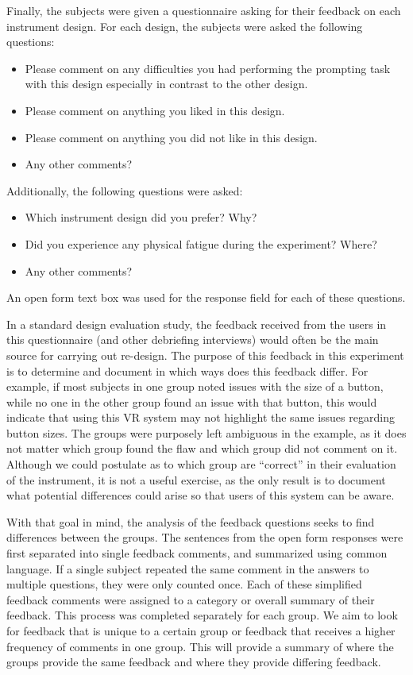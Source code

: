Finally, the subjects were given a questionnaire asking for their feedback on each instrument design.
For each design, the subjects were asked the following questions:
\begin{itemize}
    \item Please comment on any difficulties you had performing the prompting task with this design especially in contrast to the other design.
    \item Please comment on anything you liked in this design.
    \item Please comment on anything you did not like in this design.
    \item Any other comments?
\end{itemize}
Additionally, the following questions were asked:
\begin{itemize}
    \item Which instrument design did you prefer? Why?
    \item Did you experience any physical fatigue during the experiment? Where?
    \item Any other comments?
\end{itemize}
An open form text box was used for the response field for each of these questions.

In a standard design evaluation study, the feedback received from the users in this questionnaire (and other debriefing interviews) would often be the main source for carrying out re-design.
The purpose of this feedback in this experiment is to determine and document in which ways does this feedback differ.
For example, if most subjects in one group noted issues with the size of a button, while no one in the other group found an issue with that button, this would indicate that using this VR system may not highlight the same issues regarding button sizes.
The groups were purposely left ambiguous in the example, as it does not matter which group found the flaw and which group did not comment on it.
Although we could postulate as to which group are ``correct'' in their evaluation of the instrument, it is not a useful exercise, as the only result is to document what potential differences could arise so that users of this system can be aware.

With that goal in mind, the analysis of the feedback questions seeks to find differences between the groups.
The sentences from the open form responses were first separated into single feedback comments, and summarized using common language.
If a single subject repeated the same comment in the answers to multiple questions, they were only counted once.
Each of these simplified feedback comments were assigned to a category or overall summary of their feedback.
This process was completed separately for each group.
We aim to look for feedback that is unique to a certain group or feedback that receives a higher frequency of comments in one group.
This will provide a summary of where the groups provide the same feedback and where they provide differing feedback.

